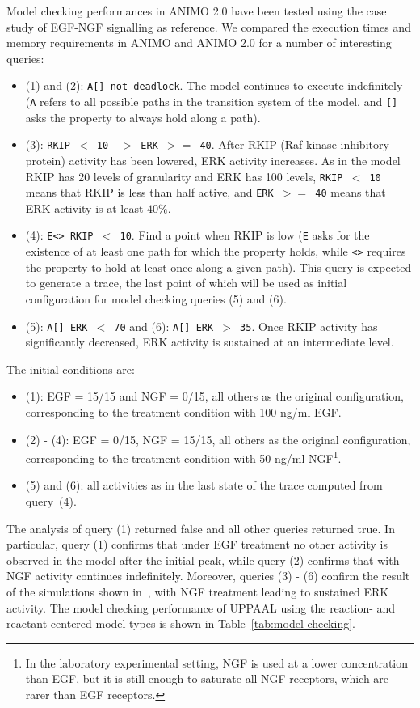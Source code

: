 \documentclass{bmcart}
\begin{document}
Model checking performances in ANIMO 2.0 have been tested using the case study of EGF-NGF signalling as reference.
We compared the execution times and memory requirements in ANIMO and ANIMO 2.0 for a number of interesting queries:
\begin{itemize}
  \item (1) and (2): {\tt A[] not deadlock}. The model continues to execute indefinitely ({\tt A} refers to all
      possible paths in the transition system of the model, and {\tt []} asks the property to always hold along a path).
  \item (3): {\tt RKIP $<$ 10 --$>$ ERK $>=$ 40}. After RKIP (Raf kinase inhibitory protein) activity has been lowered, ERK activity increases. As in the model RKIP
      has 20 levels of granularity and ERK has 100 levels, {\tt RKIP $<$ 10} means that RKIP is less than half active, and
      {\tt ERK $>=$ 40} means that ERK activity is at least $40 \%$.
  \item (4): {\tt E<> RKIP $<$ 10}. Find a point when RKIP is low ({\tt E} asks for the existence of at least one path
      for which the property holds, while {\tt <>} requires the property to hold at least once along a given path).
      This query is expected to generate a trace, the last point of which will be used as initial configuration for model checking queries (5) and (6).
  \item (5): {\tt A[] ERK $<$ 70} and (6): {\tt A[] ERK $>$ 35}. Once RKIP activity has significantly decreased, ERK activity is sustained at an intermediate level.
\end{itemize}
The initial conditions are:
\begin{itemize}
  \item (1): EGF = 15/15 and NGF = 0/15, all others as the original configuration, corresponding to the treatment condition with
	    100 ng/ml EGF.
  \item (2) - (4): EGF = 0/15, NGF = 15/15, all others as the original configuration, corresponding to the treatment condition with
	    50 ng/ml NGF\footnote{In the laboratory experimental setting, NGF is used at a lower concentration than EGF, but it is still enough to saturate all NGF receptors, which
	    are rarer than EGF receptors.}.
  \item (5) and (6): all activities as in the last state of the trace computed from query~(4).
\end{itemize}



The analysis of query (1) returned false and all other queries returned true.
In particular, query (1) confirms that under EGF treatment no other activity is observed in the model after the initial peak,
while query (2) confirms that with NGF activity continues indefinitely.
Moreover, queries (3) - (6) confirm the result of the simulations shown in~\cite{animo-bibe}, with NGF treatment leading to sustained ERK activity.
The model checking performance of UPPAAL using the reaction- and reactant-centered model types is shown in Table~\ref{tab:model-checking}.
\end{document}
